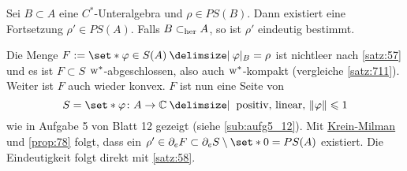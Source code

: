 \begin{korollar}[label=korr:714,{name=[Fortsetzung reiner Zustände]}]
	Sei $B \subset A$ eine $C^*$-Unteralgebra und $\rho \in PS(B)$.
	Dann existiert eine Fortsetzung $\rho' \in PS(A)$.
	Falls $B\subset_{\operatorname{her}} A$, so ist $\rho'$ eindeutig bestimmt. 
\end{korollar}
\begin{beweis}
	Die Menge $F:= \set*{\varphi \in S(A) \given \varphi|_{B}=\rho}$ ist nichtleer nach \autoref{satz:57} und es ist $F \subset S$ $\mkern1mu\mathrm{w}^*$-abgeschlossen, also auch $\mkern1mu\mathrm{w}^*$-kompakt (vergleiche \autoref{satz:711}).
	Weiter ist $F$ auch wieder konvex.
	$F$ ist nun eine Seite von 
	\[
		S = \set*{\varphi \colon A \to \mathbb{C}\given \text{ positiv, linear, } \norm*{\varphi}\le 1} 
	\]
	wie in Aufgabe 5 von Blatt 12 gezeigt (siehe \cref{sub:aufg5_12}).
	Mit \hyperref[satz:krein_milman]{Krein-Milman} und \autoref{prop:78} folgt, dass ein $\rho' \in \partial_e F \subset\partial_e S \setminus\set*{0}=PS(A)$ existiert.
	Die Eindeutigkeit folgt direkt mit \autoref{satz:58}.
\end{beweis}

